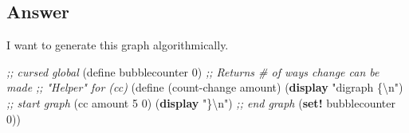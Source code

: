 \documentclass[
]{article}
\newenvironment{Shaded}{}{}
\newcommand{\CharTok}[1]{\textcolor[rgb]{0.25,0.44,0.63}{#1}}
\newcommand{\CommentTok}[1]{\textcolor[rgb]{0.38,0.63,0.69}{\textit{#1}}}
\newcommand{\DecValTok}[1]{\textcolor[rgb]{0.25,0.63,0.44}{#1}}
\newcommand{\ExtensionTok}[1]{#1}
\newcommand{\FunctionTok}[1]{\textcolor[rgb]{0.02,0.16,0.49}{#1}}
\newcommand{\KeywordTok}[1]{\textcolor[rgb]{0.00,0.44,0.13}{\textbf{#1}}}
\newcommand{\NormalTok}[1]{#1}
\newcommand{\StringTok}[1]{\textcolor[rgb]{0.25,0.44,0.63}{#1}}
\begin{document}
\hypertarget{answer-13}{%
\subsection{Answer}\label{answer-13}}

I want to generate this graph algorithmically.

\hypertarget{count-change-graphviz}{%
\label{count-change-graphviz}}%
\begin{Shaded}
\begin{Highlighting}[numbers=left,,]
\CommentTok{;; cursed global}
\NormalTok{(}\ExtensionTok{define}\FunctionTok{ bubblecounter }\DecValTok{0}\NormalTok{)}
\CommentTok{;; Returns \# of ways change can be made}
\CommentTok{;; "Helper" for (cc)}
\NormalTok{(}\ExtensionTok{define}\FunctionTok{ }\NormalTok{(count{-}change amount)}
\NormalTok{  (}\KeywordTok{display} \StringTok{"digraph \{}\CharTok{\textbackslash{}n}\StringTok{"}\NormalTok{) }\CommentTok{;; start graph}
\NormalTok{  (cc amount }\DecValTok{5} \DecValTok{0}\NormalTok{)}
\NormalTok{  (}\KeywordTok{display} \StringTok{"\}}\CharTok{\textbackslash{}n}\StringTok{"}\NormalTok{) }\CommentTok{;; end graph}
\NormalTok{  (}\KeywordTok{set!}\NormalTok{ bubblecounter }\DecValTok{0}\NormalTok{))}


\end{Highlighting}
\end{Shaded}
\end{document}
